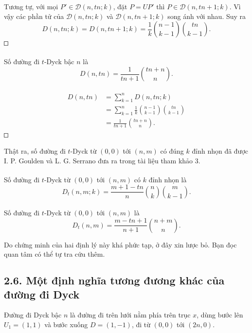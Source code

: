 \documentclass[11pt]{article}
\newcommand{\square}{\mathord{\vcenter{\hrule height .5pt
  \hbox{\vrule width .5pt height 5pt\kern5pt\vrule width .5pt}
  \hrule height .5pt}}}
\begin{document}
Tương tự, với mọi \(P'\in\mathcal D(n,tn;k)\), đặt \(P=UP'\) thì
\(P\in\mathcal D(n,tn+1;k)\). Vì vậy các phần tử của
\(\mathcal D(n,tn;k)\) và \(\mathcal D(n,tn+1;k)\) song ánh với nhau. Suy ra
\[
  D(n,tn;k)=D(n,tn+1;k)
  =\frac1k\binom{n-1}{k-1}\binom{tn}{k-1}.
\]
\(\square\)

\paragraph{}
Số đường đi \(t\)-Dyck bậc \(n\) là
\[
  D(n,tn)=\frac1{tn+1}\binom{tn+n}{n}. \tag{10}
\]

\paragraph{}
\[
\begin{aligned}
  D(n,tn)
  &=\sum_{k=1}^{n}D(n,tn;k)\\
  &=\sum_{k=1}^{n}\frac1k\binom{n-1}{k-1}\binom{tn}{k-1}\\
  &=\frac1{tn+1}\binom{tn+n}{n}.
\end{aligned}
\]
\(\square\)

Thật ra, số đường đi \(t\)-Dyck từ \((0,0)\) tới \((n,m)\) có đúng \(k\) đỉnh
nhọn đã được I. P. Goulden và L. G. Serrano đưa ra trong tài liệu tham khảo
3.

\paragraph{}
Số đường đi \(t\)-Dyck từ \((0,0)\) tới \((n,m)\) có \(k\) đỉnh nhọn là
\[
  D_t(n,m;k)=\frac{m+1-tn}{n}\binom nk\binom{m}{k-1}. \tag{11}
\]

\paragraph{}
Số đường đi \(t\)-Dyck từ \((0,0)\) tới \((n,m)\) là
\[
  D_t(n,m)=\frac{m-tn+1}{n+1}\binom{n+m}{n}. \tag{12}
\]

Do chứng minh của hai định lý này khá phức tạp, ở đây xin lược bỏ. Bạn đọc
quan tâm có thể tự tra cứu thêm.

\subsection*{2.6. Một định nghĩa tương đương khác của đường đi Dyck}

Đường đi Dyck bậc \(n\) là đường đi trên lưới nằm phía trên trục \(x\), dùng
bước lên \(U_1=(1,1)\) và bước xuống \(D=(1,-1)\), đi từ \((0,0)\) tới
\((2n,0)\).
\end{document}
